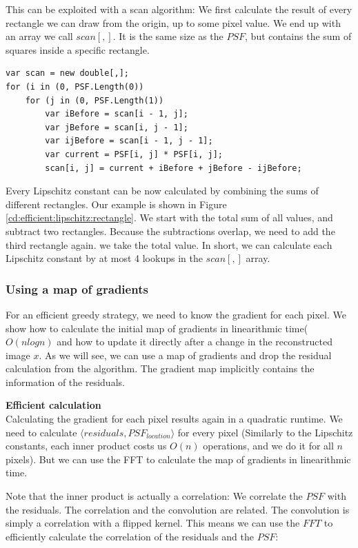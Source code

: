 This can be exploited with a scan algorithm: We first calculate the result of every rectangle we can draw from the origin, up to some pixel value. We end up with an array we call $scan[,]$. It is the same size as the $PSF$, but contains the sum of squares inside a specific rectangle.

\begin{lstlisting}
var scan = new double[,];
for (i in (0, PSF.Length(0))
	for (j in (0, PSF.Length(1))
		var iBefore = scan[i - 1, j];
		var jBefore = scan[i, j - 1];
		var ijBefore = scan[i - 1, j - 1];
		var current = PSF[i, j] * PSF[i, j];
		scan[i, j] = current + iBefore + jBefore - ijBefore;
\end{lstlisting}

Every Lipschitz constant can be now calculated by combining the sums of different rectangles. Our example is shown in Figure \ref{cd:efficient:lipschitz:rectangle}. We start with the total sum of all values, and subtract two rectangles. Because the subtractions overlap, we need to add the third rectangle again. we take the total value. In short, we can calculate each Lipschitz constant by at most 4 lookups in the $scan[,]$ array.


\subsubsection{Using a map of gradients}
For an efficient greedy strategy, we need to know the gradient for each pixel.  We show how to calculate the initial map of gradients in linearithmic time($O(n log n)$ and how to update it directly after a change in the reconstructed image $x$. As we will see, we can use a map of gradients and drop the residual calculation from the algorithm. The gradient map implicitly contains the information of the residuals.


\textbf{Efficient calculation}\\
Calculating the gradient for each pixel results again in a quadratic runtime. We need to calculate $\langle residuals, PSF_{location} \rangle$ for every pixel (Similarly to the Lipschitz constants, each inner product costs us $O(n)$ operations, and we do it for all $n$ pixels). But we can use the FFT to calculate the map of gradients in linearithmic time.

Note that the inner product is actually a correlation: We correlate the $PSF$ with the residuals. The correlation and the convolution are related. The convolution is simply a correlation with a flipped kernel. This means we can use the $FFT$ to efficiently calculate the correlation of the residuals and the $PSF$:

